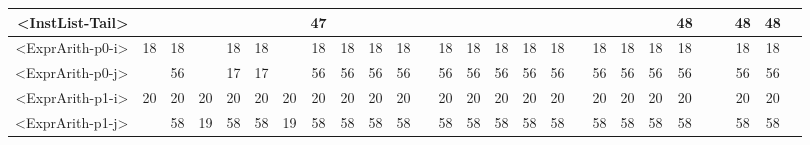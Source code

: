 \begin{tabular}{r|c@{ }c@{ }c@{ }c@{ }c@{ }c@{ }c@{ }c@{ }c@{ }c@{ }c@{ }c@{ }c@{ }c@{ }c@{ }c@{ }c@{ }c@{ }c@{ }c@{ }c@{ }c@{ }c@{ }c@{ }c@{ }c@{ }}
<InstList-Tail> &   &   &   &   &   &   & 47 &   &   &   &   &   &   &   &   &   &   &   &   &   & 48 &   &   & 48 & 48 &   \\\hline
<ExprArith-p0-i> & 18 & 18 &   & 18 & 18 &   & 18 & 18 & 18 & 18 &   & 18 & 18 & 18 & 18 & 18 &   & 18 & 18 & 18 & 18 &   &   & 18 & 18 &   \\\hline
<ExprArith-p0-j> &   & 56 &   & 17 & 17 &   & 56 & 56 & 56 & 56 &   & 56 & 56 & 56 & 56 & 56 &   & 56 & 56 & 56 & 56 &   &   & 56 & 56 &   \\\hline
<ExprArith-p1-i> & 20 & 20 & 20 & 20 & 20 & 20 & 20 & 20 & 20 & 20 &   & 20 & 20 & 20 & 20 & 20 &   & 20 & 20 & 20 & 20 &   &   & 20 & 20 &   \\\hline
<ExprArith-p1-j> &   & 58 & 19 & 58 & 58 & 19 & 58 & 58 & 58 & 58 &   & 58 & 58 & 58 & 58 & 58 &   & 58 & 58 & 58 & 58 &   &   & 58 & 58 &   \\\hline
\end{tabular}


